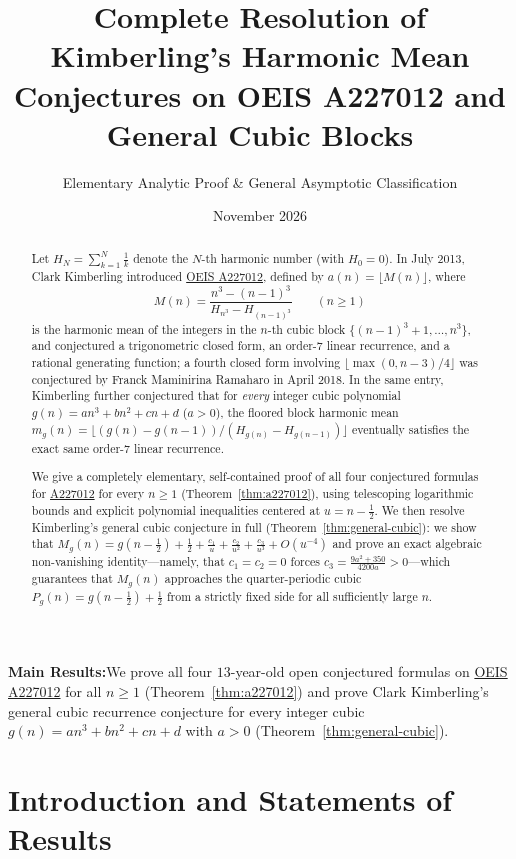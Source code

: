 \documentclass[11pt,a4paper]{article}
\title{\vspace{-12pt}\textbf{\Large Complete Resolution of Kimberling's Harmonic Mean Conjectures on OEIS A227012 and General Cubic Blocks}}
\author{Elementary Analytic Proof \& General Asymptotic Classification}
\date{November 2026}
\theoremstyle{remark}
\newcommand{\takeaway}[2]{%
  \vspace{6pt}\noindent\colorbox{primary!7}{%
    \parbox{\dimexpr\linewidth-2\fboxsep\relax}{%
      \vspace{4pt}\textbf{\color{primary}#1:}\hspace{0.5em}#2\vspace{4pt}%
    }%
  }\vspace{6pt}%
}
\begin{document}
\maketitle
\thispagestyle{plain}

\begin{abstract}
Let $H_N = \sum_{k=1}^N \frac{1}{k}$ denote the $N$-th harmonic number (with $H_0 = 0$). In July 2013, Clark Kimberling introduced \href{https://oeis.org/A227012}{OEIS A227012}, defined by $a(n) = \lfloor M(n) \rfloor$, where
\[
  M(n) = \frac{n^3 - (n-1)^3}{H_{n^3} - H_{(n-1)^3}} \qquad (n \ge 1)
\]
is the harmonic mean of the integers in the $n$-th cubic block $\{(n-1)^3 + 1, \dots, n^3\}$, and conjectured a trigonometric closed form, an order-$7$ linear recurrence, and a rational generating function; a fourth closed form involving $\lfloor \max(0,n-3)/4 \rfloor$ was conjectured by Franck Maminirina Ramaharo in April 2018. In the same entry, Kimberling further conjectured that for \emph{every} integer cubic polynomial $g(n) = an^3 + bn^2 + cn + d$ ($a > 0$), the floored block harmonic mean $m_g(n) = \lfloor (g(n)-g(n-1))/(H_{g(n)}-H_{g(n-1)}) \rfloor$ eventually satisfies the exact same order-$7$ linear recurrence.

We give a completely elementary, self-contained proof of all four conjectured formulas for \href{https://oeis.org/A227012}{A227012} for every $n \ge 1$ (Theorem~\ref{thm:a227012}), using telescoping logarithmic bounds and explicit polynomial inequalities centered at $u = n - \frac{1}{2}$. We then resolve Kimberling's general cubic conjecture in full (Theorem~\ref{thm:general-cubic}): we show that $M_g(n) = g(n - \tfrac{1}{2}) + \tfrac{1}{2} + \frac{c_1}{u} + \frac{c_2}{u^2} + \frac{c_3}{u^3} + O(u^{-4})$ and prove an exact algebraic non-vanishing identity—namely, that $c_1 = c_2 = 0$ forces $c_3 = \frac{9a^2 + 350}{4200a} > 0$—which guarantees that $M_g(n)$ approaches the quarter-periodic cubic $P_g(n) = g(n - \tfrac{1}{2}) + \tfrac{1}{2}$ from a strictly fixed side for all sufficiently large $n$.
\end{abstract}

\takeaway{Main Results}{We prove all four $13$-year-old open conjectured formulas on \href{https://oeis.org/A227012}{OEIS A227012} for all $n \ge 1$ (Theorem~\ref{thm:a227012}) and prove Clark Kimberling's general cubic recurrence conjecture for every integer cubic $g(n) = an^3 + bn^2 + cn + d$ with $a > 0$ (Theorem~\ref{thm:general-cubic}).}

\section{Introduction and Statements of Results}
\end{document}
